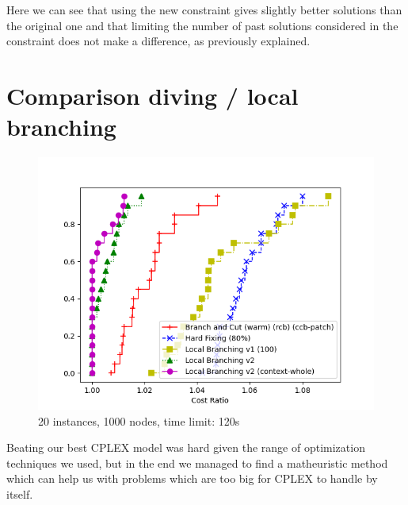 Here we can see that using the new constraint gives slightly better solutions than the original one and that limiting the number of past solutions considered in the constraint does not make a difference, as previously explained.

\section{Comparison diving / local branching}

\begin{figure}[h]
    \centering
    \includegraphics*[width=.6\textwidth]{../plots/perfprof_mat_costs.png}
    \caption*{20 instances, 1000 nodes, time limit: 120s}
\end{figure}

Beating our best CPLEX model was hard given the range of optimization techniques we used, but in the end we managed to find a matheuristic method which can help us with problems which are too big for CPLEX to handle by itself.